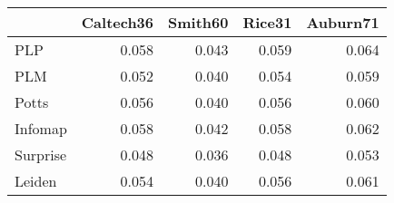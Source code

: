 \begin{tabular}{lrrrr}
\toprule
{} & Caltech36 & Smith60 & Rice31 & Auburn71 \\
\midrule
PLP      &     0.058 &   0.043 &  0.059 &    0.064 \\
PLM      &     0.052 &   0.040 &  0.054 &    0.059 \\
Potts    &     0.056 &   0.040 &  0.056 &    0.060 \\
Infomap  &     0.058 &   0.042 &  0.058 &    0.062 \\
Surprise &     0.048 &   0.036 &  0.048 &    0.053 \\
Leiden   &     0.054 &   0.040 &  0.056 &    0.061 \\
\bottomrule
\end{tabular}
